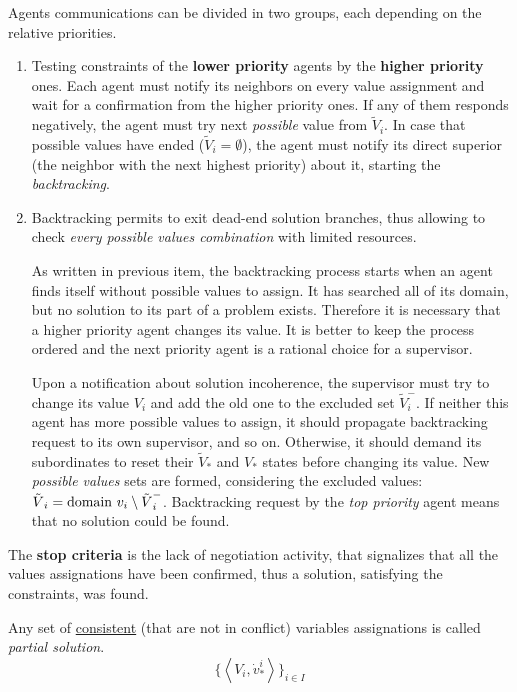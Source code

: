 \documentclass[../ThesisDoc]{subfiles}
\begin{document}
\bigskip\noindent
Agents communications can be divided in two groups, each depending on the relative
priorities.
\begin{enumerate}
  \item Testing constraints of the \textbf{lower priority} agents by the
    \textbf{higher priority} ones.
    Each agent must notify its neighbors on every value assignment and wait
    for a confirmation from the higher priority ones. If any of them responds
    negatively, the agent must try next \emph{possible} value from ${\tilde V}_i$.
    In case that possible values have ended (${\tilde V}_i = \emptyset$), the agent
    must notify its direct superior (the neighbor with the next highest priority)
    about it, starting the \emph{backtracking}.
  \item Backtracking permits to exit dead-end solution branches, thus allowing
    to check \emph{every possible values combination} with limited resources.

    As written in previous item, the backtracking process starts when an agent
    finds itself without possible values to assign. It has searched all of its
    domain, but no solution to its part of a problem exists. Therefore it is
    necessary that a higher priority agent changes its value. It is better to
    keep the process ordered and the next priority agent is a rational choice
    for a supervisor.

    Upon a notification about solution incoherence, the supervisor
    must try to change its value $V_i$ and add the old one to the
    excluded set ${\tilde V}_i^-$.
    If neither this agent has more possible values to assign, it should propagate
    backtracking request to its own supervisor, and so on. Otherwise, it should
    demand its subordinates to reset their ${\tilde V}_*$ and $V_*$ states
    before changing its value. New \emph{possible values} sets are formed, considering
    the excluded values: ${\tilde V}_i = \mathrm{domain}~v_i \setminus {\tilde V}_i^-$.
    Backtracking request by the \emph{top priority} agent means that no solution
    could be found.
\end{enumerate}

\medskip\noindent
The \textbf{stop criteria} is the lack of negotiation activity, that signalizes
that all the values assignations have been confirmed, thus a solution, satisfying
the constraints, was found.

\medskip\noindent
Any set of \underline{consistent} (that are not in conflict)
 variables assignations is called \emph{partial solution}.
$$ \lbrace\left<V_i,{\dot v}^i_*\right>\rbrace_{i \in I} $$
\end{document}
